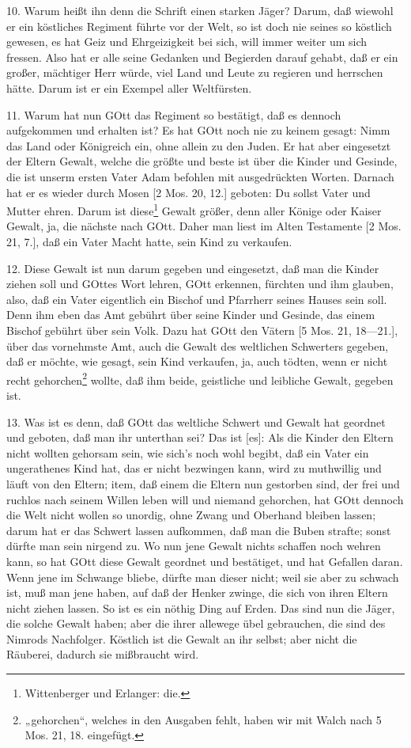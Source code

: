10. Warum heißt ihn denn die Schrift einen starken Jäger? Darum, daß wiewohl er ein köstliches Regiment führte vor der Welt, so ist doch nie seines so köstlich gewesen, es hat Geiz und Ehrgeizigkeit bei sich, will immer weiter um sich fressen. Also hat er alle seine Gedanken und Begierden darauf gehabt, daß er ein großer, mächtiger Herr würde, viel Land und Leute zu regieren und herrschen hätte. Darum ist er ein Exempel aller Weltfürsten.

11. Warum hat nun GOtt das Regiment so bestätigt, daß es dennoch aufgekommen und erhalten ist? Es hat GOtt noch nie zu keinem gesagt: Nimm das Land oder Königreich ein, ohne allein zu den Juden. Er hat aber eingesetzt der Eltern Gewalt, welche die größte und beste ist über die Kinder und Gesinde, die ist unserm ersten Vater Adam befohlen mit ausgedrückten Worten. Darnach hat er es wieder durch Mosen
[2 Mos. 20, 12.] geboten: Du sollst Vater und Mutter ehren. Darum ist diese\footnote{Wittenberger und Erlanger: die.} Gewalt größer, denn aller Könige oder Kaiser Gewalt, ja, die nächste nach GOtt. Daher man liest im Alten Testamente [2 Mos. 21, 7.], daß ein Vater Macht hatte, sein Kind zu verkaufen.

12. Diese Gewalt ist nun darum gegeben und eingesetzt, daß man die Kinder ziehen soll und GOttes Wort lehren, GOtt erkennen, fürchten und ihm glauben, also, daß ein Vater eigentlich ein Bischof und Pfarrherr seines Hauses sein soll. Denn ihm eben das Amt gebührt über seine Kinder und Gesinde, das einem Bischof gebührt über sein Volk. Dazu hat GOtt den Vätern [5 Mos. 21, 18—21.], über das vornehmste Amt, auch die Gewalt des weltlichen Schwerters gegeben, daß er möchte, wie gesagt, sein Kind verkaufen, ja, auch tödten, wenn er nicht recht gehorchen\footnote{„gehorchen“, welches in den Ausgaben fehlt, haben wir mit Walch nach 5 Mos. 21, 18. eingefügt.} wollte, daß ihm beide, geistliche und leibliche Gewalt, gegeben ist.

13. Was ist es denn, daß GOtt das weltliche Schwert und Gewalt hat geordnet und geboten, daß man ihr unterthan sei? Das ist [es]: Als die Kinder den Eltern nicht wollten gehorsam sein, wie sich’s noch wohl begibt, daß ein Vater ein ungerathenes Kind hat, das er nicht bezwingen kann, wird zu muthwillig und läuft von den Eltern; item, daß einem die Eltern nun gestorben sind, der frei und ruchlos nach seinem Willen leben will und niemand gehorchen, hat GOtt dennoch die Welt nicht wollen so unordig, ohne Zwang und Oberhand bleiben lassen; darum hat er das Schwert lassen aufkommen, daß man die Buben strafte; sonst dürfte man sein nirgend zu. Wo nun jene Gewalt nichts schaffen noch wehren kann, so hat GOtt diese Gewalt geordnet und bestätiget, und hat Gefallen daran. Wenn jene im Schwange bliebe, dürfte man dieser nicht; weil sie aber zu schwach ist, muß man jene haben, auf daß der Henker zwinge, die sich von ihren Eltern nicht ziehen lassen. So ist es ein nöthig Ding auf Erden. Das sind nun die Jäger, die solche Gewalt haben; aber die ihrer allewege übel gebrauchen, die sind des Nimrods Nachfolger. Köstlich ist die Gewalt an ihr selbst; aber nicht die Räuberei, dadurch sie mißbraucht wird.


